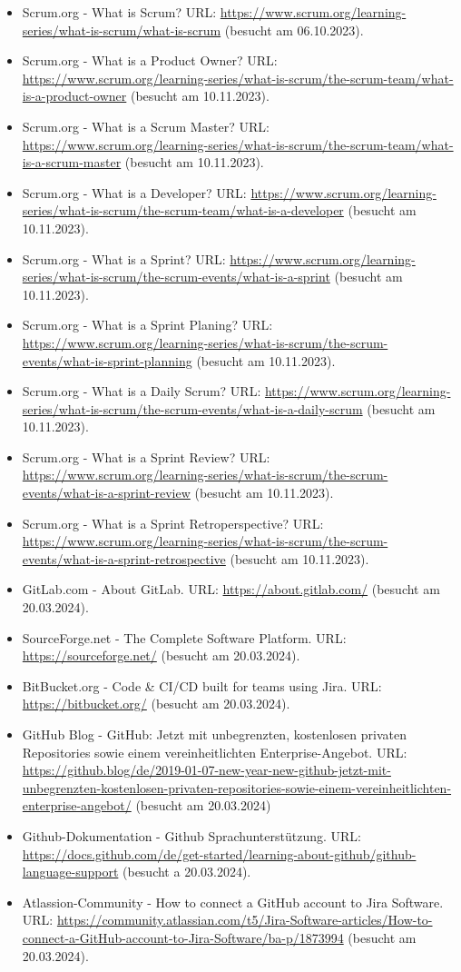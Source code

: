 \begin{itemize}
    \item Scrum.org - What is Scrum? URL: \url{https://www.scrum.org/learning-series/what-is-scrum/what-is-scrum} (besucht am 06.10.2023).
    \item Scrum.org - What is a Product Owner? URL: \url{https://www.scrum.org/learning-series/what-is-scrum/the-scrum-team/what-is-a-product-owner} (besucht am 10.11.2023).
    \item Scrum.org - What is a Scrum Master? URL: \url{https://www.scrum.org/learning-series/what-is-scrum/the-scrum-team/what-is-a-scrum-master} (besucht am 10.11.2023).
    \item Scrum.org - What is a Developer? URL: \url{https://www.scrum.org/learning-series/what-is-scrum/the-scrum-team/what-is-a-developer} (besucht am 10.11.2023).
    \item Scrum.org - What is a Sprint? URL: \url{https://www.scrum.org/learning-series/what-is-scrum/the-scrum-events/what-is-a-sprint} (besucht am 10.11.2023).
    \item Scrum.org - What is a Sprint Planing? URL: \url{https://www.scrum.org/learning-series/what-is-scrum/the-scrum-events/what-is-sprint-planning} (besucht am 10.11.2023).
    \item Scrum.org - What is a Daily Scrum? URL: \url{https://www.scrum.org/learning-series/what-is-scrum/the-scrum-events/what-is-a-daily-scrum} (besucht am 10.11.2023).
    \item Scrum.org - What is a Sprint Review? URL: \url{https://www.scrum.org/learning-series/what-is-scrum/the-scrum-events/what-is-a-sprint-review} (besucht am 10.11.2023).
    \item Scrum.org - What is a Sprint Retroperspective? URL: \url{https://www.scrum.org/learning-series/what-is-scrum/the-scrum-events/what-is-a-sprint-retrospective} (besucht am 10.11.2023).
    \item GitLab.com - About GitLab. URL: \url{https://about.gitlab.com/} (besucht am 20.03.2024).
    \item SourceForge.net - The Complete Software Platform. URL: \url{https://sourceforge.net/} (besucht am 20.03.2024).
    \item BitBucket.org - Code & CI/CD built for teams using Jira. URL: \url{https://bitbucket.org/} (besucht am 20.03.2024).
    \item GitHub Blog - GitHub: Jetzt mit unbegrenzten, kostenlosen privaten Repositories sowie einem vereinheitlichten Enterprise-Angebot. URL: \url{https://github.blog/de/2019-01-07-new-year-new-github-jetzt-mit-unbegrenzten-kostenlosen-privaten-repositories-sowie-einem-vereinheitlichten-enterprise-angebot/} (besucht am 20.03.2024)
    \item Github-Dokumentation - Github Sprachunterstützung. URL: \url{https://docs.github.com/de/get-started/learning-about-github/github-language-support} (besucht a 20.03.2024).
    \item Atlassion-Community - How to connect a GitHub account to Jira Software. URL: \url{https://community.atlassian.com/t5/Jira-Software-articles/How-to-connect-a-GitHub-account-to-Jira-Software/ba-p/1873994} (besucht am 20.03.2024).
\end{itemize}


